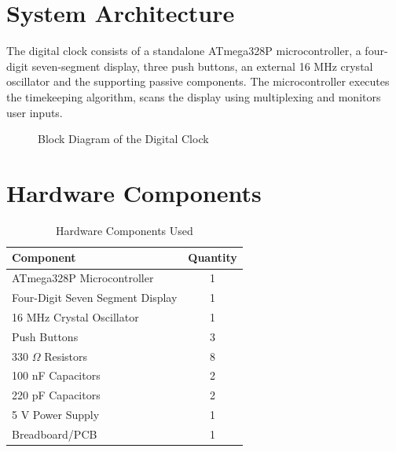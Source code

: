 \documentclass[11pt,a4paper]{report}
\begin{document}
\section{System Architecture}

The digital clock consists of a standalone ATmega328P microcontroller, a four-digit seven-segment display, three push buttons, an external 16 MHz crystal oscillator and the supporting passive components. The microcontroller executes the timekeeping algorithm, scans the display using multiplexing and monitors user inputs.

\begin{figure}[H]
\centering


\caption{Block Diagram of the Digital Clock}
\end{figure}



\section{Hardware Components}

\begin{table}[H]
\centering
\caption{Hardware Components Used}
\begin{tabular}{|l|c|}
\hline
Component & Quantity\\
\hline
ATmega328P Microcontroller & 1\\
Four-Digit Seven Segment Display & 1\\
16 MHz Crystal Oscillator & 1\\
Push Buttons & 3\\
330 $\Omega$ Resistors & 8\\
100 nF Capacitors & 2\\
220 pF Capacitors & 2\\
5 V Power Supply & 1\\
Breadboard/PCB & 1\\
\hline
\end{tabular}
\end{table}
\end{document}
